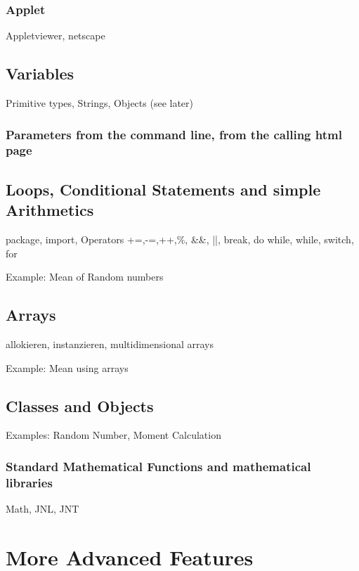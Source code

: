 \subsubsection{Applet}

Appletviewer, netscape


\subsection{Variables}
\label{sec:Variables}
Primitive types, Strings, Objects (see later)

\subsubsection{Parameters from the command line, from the calling html page}

\subsection{Loops, Conditional Statements and simple Arithmetics}
\label{sec:Loops}
package, import, Operators +=,-=,++,\%, \&\&, ||, break,
do while, while, switch, for

Example: Mean of Random numbers

\subsection{Arrays}
\label{sec:Arrays}
allokieren, instanzieren, multidimensional arrays

Example: Mean using arrays

\subsection{Classes and Objects}
\label{sec:Classes_and_Objects}
Examples: Random Number, Moment Calculation


\subsubsection{Standard Mathematical Functions and mathematical libraries}
\label{sec:Standard_Math}
Math, JNL, JNT  

\section{More Advanced Features}

